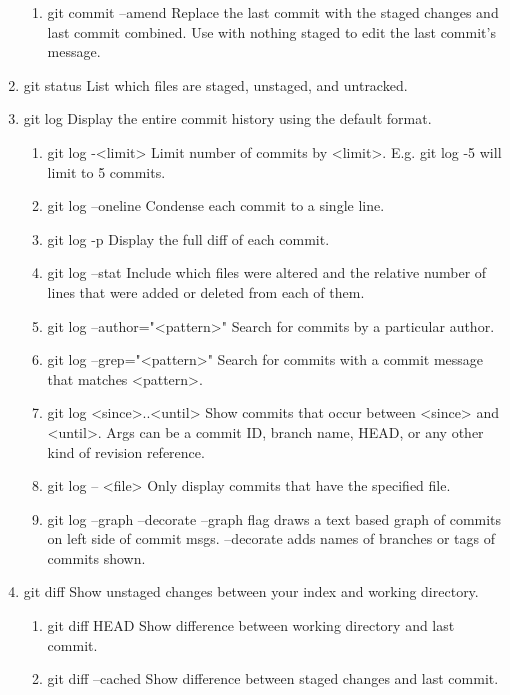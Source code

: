 \documentclass[11pt]{article}
\begin{document}
\begin{enumerate}
\begin{enumerate}
\item git commit --amend
\label{sec:orgcb2dc12}
Replace the last commit with the staged changes and last commit
combined. Use with nothing staged to edit the last commit’s message.
\end{enumerate}
\item git status
\label{sec:org810d387}
List which files are staged, unstaged, and untracked.
\item git log
\label{sec:orgcc03076}
Display the entire commit history using the default format.
\begin{enumerate}
\item git log -<limit>
\label{sec:orgb17bc4d}
Limit number of commits by <limit>. E.g. git log -5 will limit to 5
commits.
\item git log --oneline
\label{sec:org94d4c1f}
Condense each commit to a single line.
\item git log -p
\label{sec:org4937380}
Display the full diff of each commit.
\item git log --stat
\label{sec:org8a0d896}
Include which files were altered and the relative number of lines
that were added or deleted from each of them.
\item git log --author="<pattern>"
\label{sec:orgbf9306a}
Search for commits by a particular author.
\item git log --grep="<pattern>"
\label{sec:org2dc78a1}
Search for commits with a commit message that matches <pattern>.
\item git log <since>..<until>
\label{sec:org6fe322d}
Show commits that occur between <since> and <until>. Args can be a
commit ID, branch name, HEAD, or any other kind of revision reference.
\item git log -- <file>
\label{sec:org323206a}
Only display commits that have the specified file.
\item git log --graph --decorate
\label{sec:orga2afa6e}
--graph flag draws a text based graph of commits on left side of commit
msgs. --decorate adds names of branches or tags of commits shown.
\end{enumerate}
\item git diff
\label{sec:org9ee9524}
Show unstaged changes between your index and working directory.
\begin{enumerate}
\item git diff HEAD
\label{sec:orged3958d}
Show difference between working directory and last commit.
\item git diff --cached
\label{sec:orgf4cefbd}
Show difference between staged changes and last commit.
\end{enumerate}
\end{enumerate}
\end{document}
